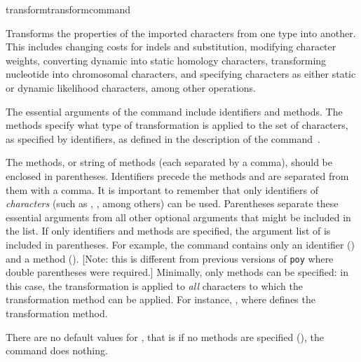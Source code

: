\begin{command}{transform}{transformcommand}


	\begin{poydescription} 
            Transforms the properties of the imported characters from one type into
            another. This includes changing costs for indels and substitution,
            modifying character weights, converting dynamic into static homology characters,
            transforming nucleotide into chromosomal characters, and specifying characters as either 
            static or dynamic likelihood characters, among other operations.
            
            The essential arguments of the command  
            include identifiers and methods. The methods
            specify what type of transformation is applied to the set of characters,
            as specified by identifiers, as defined in the description of the command~.
          
          
            The methods, or string of methods (each separated by a comma), should be enclosed in 
            parentheses. Identifiers precede the methods and are separated from them with a comma.
            It is important to remember that only identifiers of \emph{characters} 
            (such as , , among
            others) can be used. Parentheses separate these essential arguments from all other 
            optional arguments that might be included
            in the list. If only identifiers and methods are specified,
            the argument list of  is included in 
            parentheses. For example, the command  
            contains only an identifier () and a
            method ().  [Note: this is different from previous versions of \texttt{poy} 
            where double parentheses were required.]  Minimally, only methods can be
            specified: in this case, the transformation is applied to \emph{all}
            characters to which the transformation method can be applied. For instance,
            , where
             defines
            the transformation method.

            There are no default values for , that is if
            no methods are specified (), the command does nothing.
	\end{poydescription}


\end{command}
